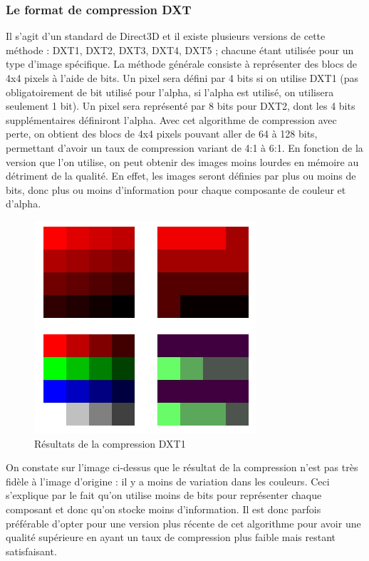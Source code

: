 \documentclass[a4paper, 12pt]{article} %
\begin{document}
\newpage
\subsubsection{Le format de compression DXT}
Il s'agit d'un standard de Direct3D et il existe plusieurs versions de cette méthode : DXT1, DXT2, DXT3, DXT4, DXT5 ; chacune étant utilisée pour un type d'image spécifique. La méthode générale consiste à représenter des blocs de 4x4 pixels à l'aide de bits. Un pixel sera défini par 4 bits si on utilise DXT1 (pas obligatoirement de bit utilisé pour l'alpha, si l'alpha est utilisé, on utilisera seulement 1 bit). Un pixel sera représenté par 8 bits pour DXT2, dont les 4 bits supplémentaires définiront l'alpha. Avec cet algorithme de compression avec perte, on obtient des blocs de 4x4 pixels pouvant aller de 64 à 128 bits, permettant d'avoir un taux de compression variant de 4:1 à 6:1. En fonction de la version que l'on utilise, on peut obtenir des images moins lourdes en mémoire au détriment de la qualité. En effet, les images seront définies par plus ou moins de bits, donc plus ou moins d'information pour chaque composante de couleur et d'alpha.

\begin{figure}[!h]%
\begin{center}
	\includegraphics[width=0.5\columnwidth]{images/texture_dxt.png}%
	\caption{Résultats de la compression DXT1}%
	\label{}%
\end{center}
\end{figure}

On constate sur l'image ci-dessus que le résultat de la compression n'est pas très fidèle à l'image d'origine : il y a moins de variation dans les couleurs. Ceci s'explique par le fait qu'on utilise moins de bits pour représenter chaque composant et donc qu'on stocke moins d'information. Il est donc parfois préférable d'opter pour une version plus récente de cet algorithme pour avoir une qualité supérieure en ayant un taux de compression plus faible mais restant satisfaisant.
\end{document}
